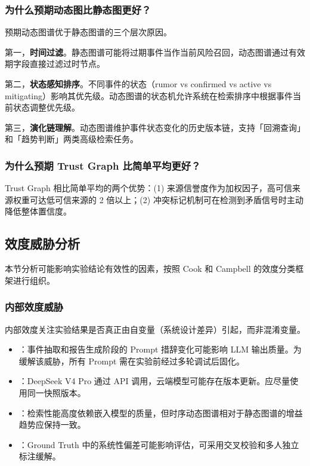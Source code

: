 \subsubsection{为什么预期动态图比静态图更好？}

预期动态图谱优于静态图谱的三个层次原因。

第一，\textbf{时间过滤}。静态图谱可能将过期事件当作当前风险召回，动态图谱通过有效期字段直接过滤过时节点。

第二，\textbf{状态感知排序}。不同事件的状态（rumor vs confirmed vs active vs mitigating）影响其优先级。动态图谱的状态机允许系统在检索排序中根据事件当前状态调整优先级。

第三，\textbf{演化链理解}。动态图谱维护事件状态变化的历史版本链，支持「回溯查询」和「趋势判断」两类高级检索任务。

\subsubsection{为什么预期 Trust Graph 比简单平均更好？}

Trust Graph 相比简单平均的两个优势：(1) 来源信誉度作为加权因子，高可信来源权重可达低可信来源的 2 倍以上；(2) 冲突标记机制可在检测到矛盾信号时主动降低整体置信度。

\subsection{效度威胁分析}
\label{sec:exp-threats}

本节分析可能影响实验结论有效性的因素，按照 Cook 和 Campbell 的效度分类框架进行组织。

\subsubsection{内部效度威胁}

内部效度关注实验结果是否真正由自变量（系统设计差异）引起，而非混淆变量。

\begin{itemize}
    \item {}：事件抽取和报告生成阶段的 Prompt 措辞变化可能影响 LLM 输出质量。为缓解该威胁，所有 Prompt 需在实验前经过多轮调试后固化。
    \item {}：DeepSeek V4 Pro 通过 API 调用，云端模型可能存在版本更新。应尽量使用同一快照版本。
    \item {}：检索性能高度依赖嵌入模型的质量，但时序动态图谱相对于静态图谱的增益趋势应保持一致。
    \item {}：Ground Truth 中的系统性偏差可能影响评估，可采用交叉校验和多人独立标注缓解。
\end{itemize}

